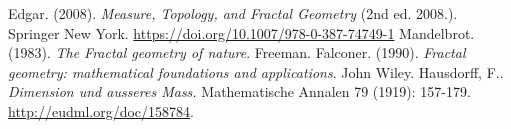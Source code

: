 \begin{thebibliography}{99}
    
 Edgar. (2008). \textit{Measure, Topology, and Fractal Geometry} (2nd ed. 2008.). Springer New York. \url{https://doi.org/10.1007/978-0-387-74749-1}
 Mandelbrot. (1983). \textit{The Fractal geometry of nature}. Freeman.
 Falconer. (1990). \textit{Fractal geometry: mathematical foundations and applications}. John Wiley.
 Hausdorff, F.. \textit{Dimension und ausseres Mass.} Mathematische Annalen 79 (1919): 157-179. \url{http://eudml.org/doc/158784}.

\end{thebibliography}